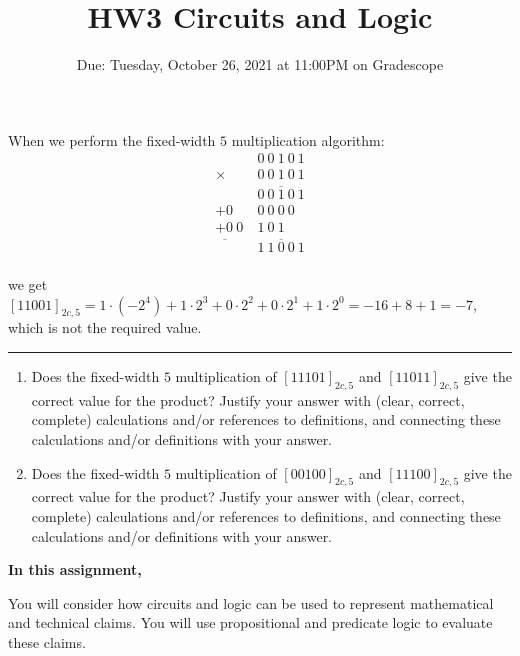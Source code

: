 \documentclass[12pt, oneside]{article}
\begin{document}
\begin{enumerate}
    When we perform the fixed-width $5$ multiplication algorithm:
    \begin{align*}
            & 0~ 0~ 1~ 0~ 1\\
     \times & 0~ 0~ 1~ 0~ 1\\
     &\overline{0~ 0~ 1~ 0~ 1}\\
     + {0~} & {0~0~0~0~~}\\
     + {0~0~} & {1~0~1~~}\\
     \overline{\phantom{0~0~}}&\overline{1~ 1~ 0~ 0~ 1}\\
    \end{align*}

    we get $[11001]_{2c,5} = 1\cdot (-2^4) + 1 \cdot 2^3 + 0 \cdot 2^2 + 0 \cdot 2^1 + 1 \cdot 2^0 = -16 + 8 + 1 = -7$, 
    which is not the required value.

    \rule{0.5\textwidth}{.4pt}


    \begin{enumerate}
        \item Does the fixed-width $5$ multiplication of $[11101]_{2c,5}$ and 
        $[11011]_{2c,5}$ give the correct value for the product?
        Justify your answer  
        with (clear, correct, complete) calculations and/or references to definitions, 
        and connecting these
        calculations and/or definitions with
        your answer.
        
        \item Does the fixed-width $5$ multiplication of $[00100]_{2c,5}$ and 
        $[11100]_{2c,5}$ give the correct value for the product?
        Justify your answer  
        with (clear, correct, complete) calculations and/or references to definitions, 
        and connecting these
        calculations and/or definitions with
        your answer.
    \end{enumerate}
    
\end{enumerate}
\newpage

\title{HW3 Circuits and Logic}
\date{Due: Tuesday, October 26, 2021 at 11:00PM on Gradescope}


\maketitle
\thispagestyle{fancy}

{\bf In this assignment,}

You will consider how circuits and logic can be used to represent
mathematical and technical claims. You will use propositional 
and predicate logic to evaluate these claims.
\end{document}
